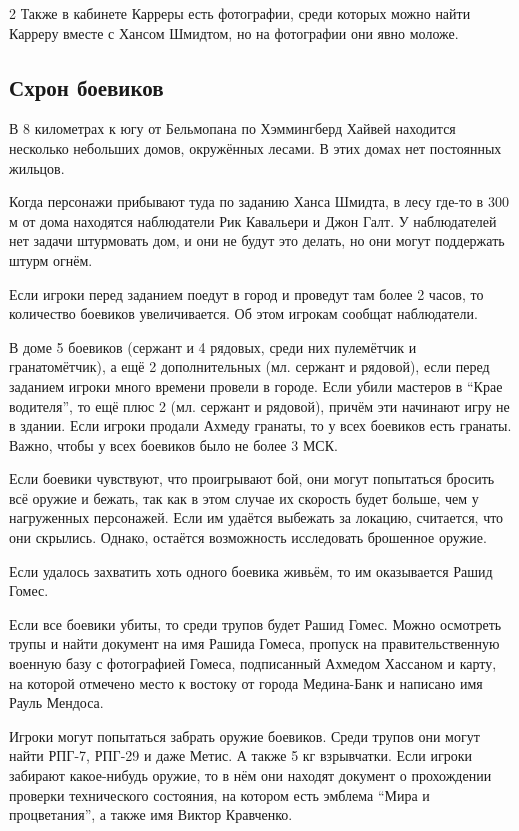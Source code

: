 \documentclass[twoside]{article}
\begin{document}
\begin{multicols}{2}
Также в кабинете Карреры есть фотографии, среди которых можно найти
Карреру вместе с Хансом Шмидтом, но на фотографии они явно моложе.

\subsection{Схрон боевиков}\label{militant-hideout}

В 8 километрах к югу от Бельмопана по Хэммингберд Хайвей находится
несколько небольших домов, окружённых лесами. В этих домах нет
постоянных жильцов.

Когда персонажи прибывают туда по заданию Ханса Шмидта, в лесу где-то в
300 м от дома находятся наблюдатели Рик Кавальери и Джон Галт. У
наблюдателей нет задачи штурмовать дом, и они не будут это делать, но
они могут поддержать штурм огнём.

Если игроки перед заданием поедут в город и проведут там более 2 часов,
то количество боевиков увеличивается. Об этом игрокам сообщат
наблюдатели.

В доме 5 боевиков (сержант и 4 рядовых, среди них пулемётчик и
гранатомётчик), а ещё 2 дополнительных (мл. сержант и рядовой), если
перед заданием игроки много времени провели в городе. Если убили
мастеров в \enquote{Крае водителя}, то ещё плюс 2 (мл. сержант и рядовой),
причём эти начинают игру не в здании. Если игроки продали Ахмеду
гранаты, то у всех боевиков есть гранаты. Важно, чтобы у всех боевиков
было не более 3 МСК.

Если боевики чувствуют, что проигрывают бой, они могут попытаться
бросить всё оружие и бежать, так как в этом случае их скорость будет
больше, чем у нагруженных персонажей. Если им удаётся выбежать за
локацию, считается, что они скрылись. Однако, остаётся возможность
исследовать брошенное оружие.

Если удалось захватить хоть одного боевика живьём, то им оказывается
Рашид Гомес.

Если все боевики убиты, то среди трупов будет Рашид Гомес. Можно
осмотреть трупы и найти документ на имя Рашида Гомеса, пропуск на
правительственную военную базу с фотографией Гомеса, подписанный Ахмедом
Хассаном и карту, на которой отмечено место к востоку от города
Медина-Банк и написано имя Рауль Мендоса.

Игроки могут попытаться забрать оружие боевиков. Среди трупов они могут
найти РПГ-7, РПГ-29 и даже Метис. А также 5 кг взрывчатки. Если игроки
забирают какое-нибудь оружие, то в нём они находят документ о
прохождении проверки технического состояния, на котором есть эмблема
\enquote{Мира и процветания}, а также имя Виктор Кравченко.


\end{multicols}
\end{document}
